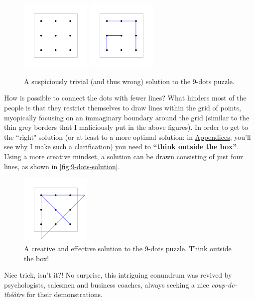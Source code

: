\documentclass[11pt]{article}
\begin{document}
\begin{figure}[H]
\centering
\includegraphics[width=0.3\textwidth]{images/9-dots-grid.png}
\includegraphics[width=0.3\textwidth]{images/9-dots-wrong-solution.png}
\caption{A suspiciously trivial (and thus wrong) solution to the 9-dots puzzle.}
\label{fig:9-dots-wrong}
\end{figure}
How is possible to connect the dots with fewer lines?
What hinders most of the people is that they restrict themselves to draw lines within the grid of points, myopically focusing on an immaginary boundary around the grid (similar to the thin grey borders that I maliciously put in the above figures). In order to get to the ``right" solution (or at least to a more optimal solution: in \hyperlink{appendices}{Appendices}, you'll see why I make such a clarification) you need to \textbf{``think outside the box''}. Using a more creative mindset, a solution can be drawn consisting of just four lines, as shown in \autoref{fig:9-dots-solution}.
\begin{figure}[H]
\centering
\includegraphics[width=0.3\textwidth]{images/9-dots-solution.png}
\caption{A creative and effective solution to the 9-dots puzzle. Think outside the box!}
\label{fig:9-dots-solution}
\end{figure}
Nice trick, isn't it?! No surprise, this intriguing conundrum was revived by psychologists, salesmen and business coaches, always seeking a nice \emph{coup-de-théâtre} for their demonstrations.
\end{document}
